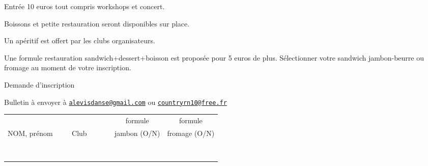 \documentclass[12pt,a4paper]{article}
\begin{document}
\vfill
\hrulefill
\vfill

Entrée 10 euros tout compris workshops et concert.

Boissons et petite restauration seront disponibles sur place.

Un apéritif est offert par les clubs organisateurs.

Une formule restauration sandwich+dessert+boisson est proposée pour 5
euros de plus. Sélectionner votre sandwich jambon-beurre ou fromage au moment de
votre inscription.

\vfill
\hrulefill
\vfill

\begin{center}
Demande d'inscription
\end{center}

Bulletin à envoyer à
\href{mailto:alevisdanse@gmail.com?subject=Inscription Bal 13 Decembre}{\texttt{\color{blue}alevisdanse@gmail.com}} ou \href{mailto:countryrn10@free.fr}{\texttt{\color{blue}countryrn10@free.fr}}

\begin{center}
\begin{tabular}{|p{0.3\linewidth}|p{0.2\linewidth}|c|c|}
\hline
     & & formule & formule \\
  NOM, prénom & Club & jambon (O/N) & fromage (O/N) \\
  \hline
  & & & \\
  & & & \\
  \hline
  & & & \\
  & & & \\
  \hline
  & & & \\
  & & & \\
  \hline
  & & & \\
  & & & \\
  \hline
\end{tabular}
\end{center}
\end{document}
